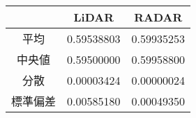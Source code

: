 \begin{tabular}{crr}
\hline
        & \multicolumn{1}{c}{LiDAR} & \multicolumn{1}{c}{RADAR} \\
\hline
\hline
平均    & 0.59538803 & 0.59935253 \\
中央値   & 0.59500000 & 0.59958800 \\
分散    & 0.00003424 & 0.00000024 \\
標準偏差  & 0.00585180 & 0.00049350 \\
\hline
\end{tabular}
